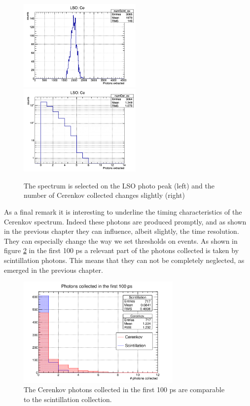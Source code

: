 \begin{figure}[htbp]
\begin{center}
\includegraphics[width=6cm]{../Pictures/Chapter_5/pp_LSO.png}
\includegraphics[width=6cm]{../Pictures/Chapter_5/cer_extr_LSO.png}
\end{center}
\caption[Photopeak selection for Cerenkov simulation]{The spectrum is selected on the LSO photo peak (left) and the number of Cerenkov collected changes slightly (right)}
\label{fig:ceren_pp}
\end{figure}
As a final remark it is interesting to underline the timing characteristics of the Cerenkov spectrum. Indeed these photons are produced promptly, and as shown in the previous chapter they can influence, albeit slightly, the time resolution. They can especially change the way we set thresholds on events.
As shown in figure \ref{fig:time_ratio} in the first 100 ps a relevant part of the photons collected is taken by scintillation photons. This means that they can not be completely neglected, as emerged in the previous chapter.
\begin{figure}[htbp]
\begin{center}
\includegraphics[width=8cm]{../Pictures/Chapter_5/cer_second_balance.png}
\end{center}
\caption[Scintillation/Cerenkov ratio in the first 100 ps]{The Cerenkov photons collected in the first 100 ps are comparable to the scintillation collection.}
\label{fig:time_ratio}
\end{figure}

